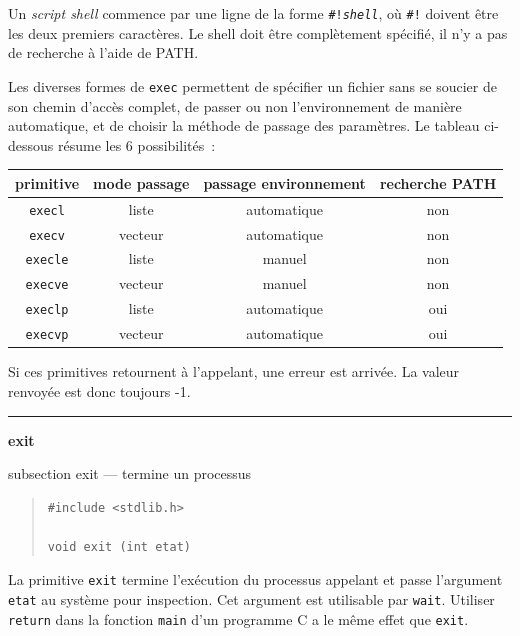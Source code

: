 \documentclass [twoside] {report}
\newcommand {\primitive} [1]
    {
	\phantomsection
	{\large \textbf {#1}}
	\addcontentsline {toc} {subsection} {#1}
    }
\newcommand {\separation}
    {
	\vspace {5mm}
	\nopagebreak
	\hrule
    }
\begin{document}
Un \textit {script shell} commence par une ligne de la
forme \texttt {\#!\textit {shell}}, où \texttt {\#!} doivent être les deux
premiers caractères. Le shell doit être
complètement spécifié, il n'y a pas de recherche à
l'aide de PATH.

Les diverses formes de \texttt {exec} permettent de
spécifier un fichier sans se soucier de son chemin
d'accès complet, de passer ou non l'environnement
de manière automatique, et de choisir la méthode
de passage des paramètres. Le tableau ci-dessous
résume les 6 possibilités~:

\begin {center}
    \begin {tabular} {|c|c|c|c|}
	\hline
	\multicolumn {1}{|c|}{primitive} &
	\multicolumn {1}{|c|}{mode passage} &
	\multicolumn {1}{|c|}{passage environnement} &
	\multicolumn {1}{|c|}{recherche PATH} \\
	\hline
	\texttt {execl}		&    liste	& automatique &  non \\
	\texttt {execv}		&  vecteur	& automatique &  non \\
	\texttt {execle}	&    liste	&      manuel &  non \\
	\texttt {execve}	&  vecteur	&      manuel &  non \\
	\texttt {execlp}	&    liste	& automatique &  oui \\
	\texttt {execvp}	&  vecteur	& automatique &  oui \\
	\hline
    \end {tabular}
\end {center}


Si ces primitives retournent à l'appelant, une erreur est
arrivée. La valeur renvoyée est donc toujours -1.




\separation
\primitive {exit} --- termine un processus

\begin {quote}
\begin {verbatim}
#include <stdlib.h>

void exit (int etat)
\end{verbatim}
\end {quote}

La primitive \texttt {exit} termine l'exécution du
processus appelant et passe l'argument \texttt {etat} au
système pour inspection. Cet argument est
utilisable par \texttt {wait}. Utiliser \texttt {return} dans la
fonction \texttt {main} d'un programme C a le même effet
que \texttt {exit}.
\end{document}
